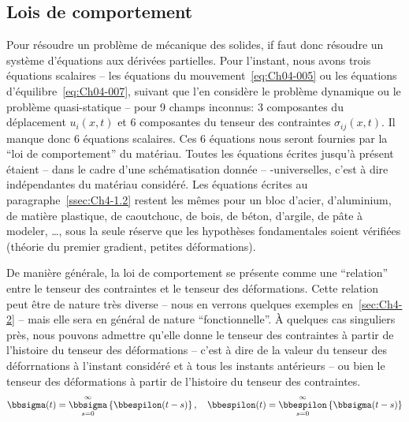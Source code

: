 \subsection{Lois de comportement}  \label{ssec:Ch4-1.3}
Pour résoudre un problème de mécanique des solides, if faut donc résoudre un système d'équations aux dérivées partielles.
Pour l'instant, nous avons trois équations scalaires -- les équations du mouvement~\eqref{eq:Ch04-005} ou les équations d'équilibre~\eqref{eq:Ch04-007}, suivant que l'en considère le problème dynamique ou le problème quasi-statique -- pour 9 champs inconnus: 3 composantes du déplacement $u_i(x,t)$ et 6 composantes du tenseur des contraintes $\sigma_{ij}(x,t)$.
Il manque donc 6 équations scalaires.
Ces 6 équations nous seront fournies par la ``loi de comportement'' du matériau.
Toutes les équations écrites jusqu'à présent étaient -- dans le cadre d'une schématisation donnée -- -universelles, c'est à dire indépendantes du matériau considéré.
Les équations écrites au paragraphe~\ref{ssec:Ch4-1.2} restent les mêmes pour un bloc d'acier, d'aluminium, de matière plastique, de caoutchouc, de bois, de béton, d'argile, de pâte à modeler, \ldots , sous la seule réserve que les hypothèses fondamentales soient vérifiées (théorie du premier gradient, petites déformations).

De manière générale, la loi de comportement se présente comme une ``relation'' entre le tenseur des contraintes et le tenseur des déformations.
Cette relation peut être de nature très diverse -- nous en verrons quelques exemples en~\ref{sec:Ch4-2} -- mais elle sera en général de nature ``fonctionnelle''.
À quelques cas singuliers près, nous pouvons admettre qu'elle donne le tenseur des contraintes à partir de l'histoire du tenseur des déformations -- c'est à dire de la valeur du tenseur des déforrnations à l'instant considéré et à tous les instants antérieurs -- ou bien le tenseur des déformations à partir de l'histoire du tenseur des contraintes.
\begin{equation}
    \bbsigma (t) = \mathop{\bbsigma}_{s=0}^{\infty} \left\{ \bbespilon (t-s) \right\}, \quad \bbespilon (t) = \mathop{\bbespilon}_{s=0}^{\infty} \left\{ \bbsigma (t-s) \right\}
    \label{eq:Ch04-028}
\end{equation}

